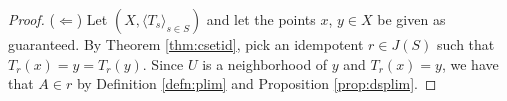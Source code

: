 \documentclass[12pt]{article}
\theoremstyle{plain}
\theoremstyle{definition}
\newcommand{\la}{\langle}
\newcommand{\ra}{\rangle}
\newcommand{\ds}{(X, \la T_s \ra_{s\in S})}
\begin{document}
\begin{proof}
   ($\Leftarrow$) Let $\ds$ and let the points $x$, $y \in X$ be given as
   guaranteed.
   By Theorem \ref{thm:csetid}, pick an idempotent $r \in J(S)$
   such that $T_r(x) = y = T_r(y)$. 
   Since $U$ is a neighborhood of $y$ and $T_r(x) = y$, we have that
   $A \in r$ by Definition \ref{defn:plim} and Proposition \ref{prop:dsplim}. 
 \end{proof}


\theendnotes



\end{document}
